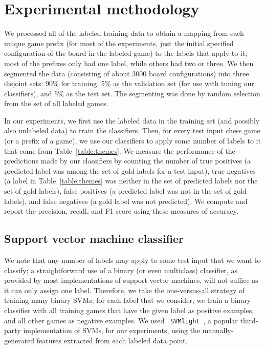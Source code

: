 \documentclass[11pt]{article}
\begin{document}
\section{Experimental methodology}
We processed all of the labeled training data to obtain a mapping from 
each unique game prefix (for most of the experiments, just the initial 
specified configuration of the board in the labeled game) to the labels 
that apply to it; most of the prefixes only had one label, while others 
had two or three. We then segmented the data (consisting of about 3000 
board configurations) into three disjoint sets: 90\% for training, 5\% 
as the validation set (for use with tuning our classifiers), and 5\% as 
the test set. The segmenting was done by random selection from the set 
of all labeled games.

In our experiments, we first use the labeled data in the training set 
(and possibly also unlabeled data) to train the classifiers. Then, for 
every test input chess game (or a prefix of a game), we use our 
classifiers to apply some number of labels to it that come from 
Table~\ref{table:themes}. We measure the performance of the predictions 
made by our classifiers by counting the number of true positives (a 
predicted label was among the set of gold labels for a test input), true 
negatives (a label in Table~\ref{table:themes} was neither in the set of 
predicted labels nor the set of gold labels), false positives (a 
predicted label was not in the set of gold labels), and false negatives 
(a gold label was not predicted). We compute and report the precision, 
recall, and F1 score using these measures of accuracy.

\subsection{Support vector machine classifier}
We note that any number of labels may apply to some test input that we 
want to classify; a straightforward use of a binary (or even multiclass) 
classifier, as provided by most implementations of support vector 
machines, will not suffice as it can only assign one label. Therefore, 
we take the one-versus-all strategy of training many binary SVMs; for 
each label that we consider, we train a binary classifier with all 
training games that have the given label as positive examples, and all 
other games as negative examples. We used {\tt 
SVMlight}~\cite{svmlight}, a popular third-party implementation of SVMs, 
for our experiments, using the manually-generated features extracted 
from each labeled data point.
\end{document}
